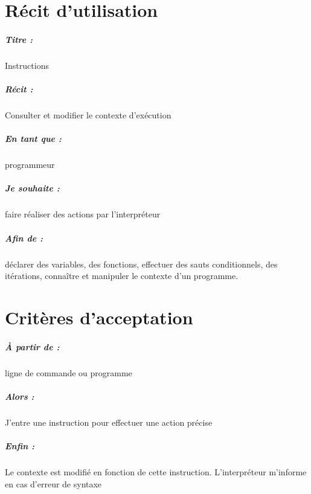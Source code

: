 \documentclass[12pt,a5paper, notitle, oneside]{report}
\begin{document}
    \chapter*{Récit d'utilisation}

    \paragraph{Titre : } Instructions
    \paragraph{Récit : } Consulter et modifier le contexte d'exécution
    \paragraph{En tant que : } programmeur
    \paragraph{Je souhaite : } faire réaliser des actions par l'interpréteur
    \paragraph{Afin de : } déclarer des variables, des fonctions, effectuer des
    sauts conditionnels, des itérations, connaître et manipuler le contexte
    d'un programme.
    \newpage

    \chapter*{Critères d'acceptation}

    \paragraph{À partir de : } ligne de commande ou programme
    \paragraph{Alors : } J'entre une instruction pour effectuer une action précise
    \paragraph{Enfin : } Le contexte est modifié en fonction de cette instruction.
    L'interpréteur m'informe en cas d'erreur de syntaxe
\end{document}
